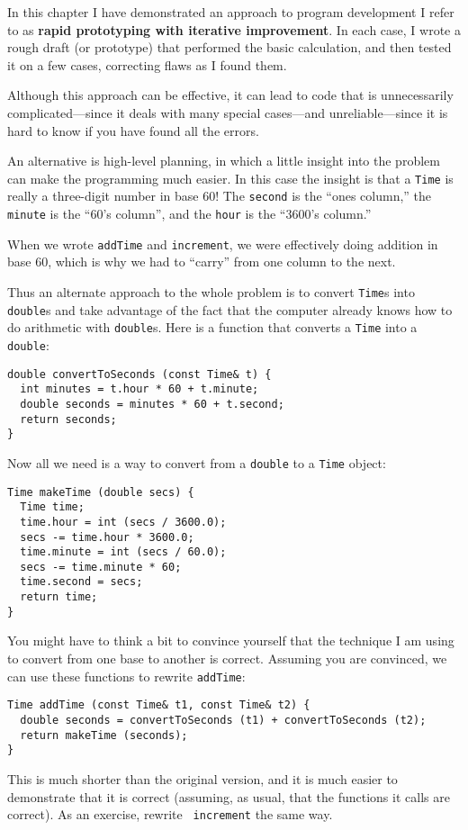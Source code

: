In this chapter I have demonstrated an approach to program
development I refer to as {\bf rapid prototyping with iterative
improvement}.  In each case, I wrote a rough draft (or prototype)
that performed the basic calculation, and then tested it on
a few cases, correcting flaws as I found them.

Although this approach can be effective, it can lead to code
that is unnecessarily complicated---since it deals with many
special cases---and unreliable---since it is hard to know if
you have found all the errors.

An alternative is high-level planning, in which a little insight
into the problem can make the programming much easier.  In
this case the insight is that a {\tt Time} is really a three-digit
number in base 60!  The {\tt second} is the ``ones column,''
the {\tt minute} is the ``60's column'', and the {\tt hour}
is the ``3600's column.''

When we wrote {\tt addTime} and {\tt increment}, we were effectively
doing addition in base 60, which is why we had to ``carry'' from one
column to the next.


Thus an alternate approach to the whole problem is to convert
{\tt Time}s into {\tt double}s and take advantage of the fact that
the computer already knows how to do arithmetic with {\tt double}s.
Here is a function that converts a {\tt Time} into a {\tt double}:

\begin{verbatim}
double convertToSeconds (const Time& t) {
  int minutes = t.hour * 60 + t.minute;
  double seconds = minutes * 60 + t.second;
  return seconds;
}
\end{verbatim}
%
Now all we need is a way to convert from a {\tt double}
to a {\tt Time} object:

\begin{verbatim}
Time makeTime (double secs) {
  Time time;
  time.hour = int (secs / 3600.0);
  secs -= time.hour * 3600.0;
  time.minute = int (secs / 60.0);
  secs -= time.minute * 60;
  time.second = secs;
  return time;
}
\end{verbatim}
%
You might have to think a bit to convince yourself that the technique
I am using to convert from one base to another is correct.  Assuming
you are convinced, we can use these functions to rewrite {\tt addTime}:

\begin{verbatim}
Time addTime (const Time& t1, const Time& t2) {
  double seconds = convertToSeconds (t1) + convertToSeconds (t2);
  return makeTime (seconds);
}
\end{verbatim}
%
This is much shorter than the original version, and it is much easier
to demonstrate that it is correct (assuming, as usual, that the
functions it calls are correct).  As an exercise, rewrite {\tt
increment} the same way.


